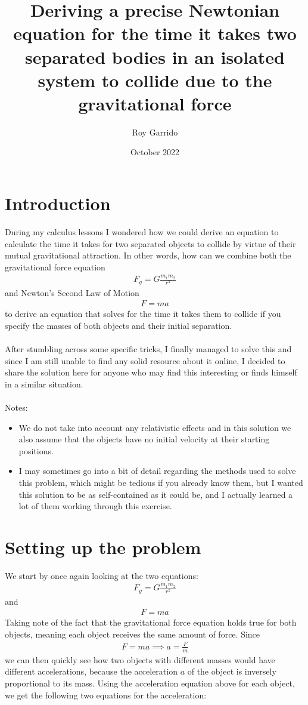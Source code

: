 \documentclass{article}
\title{Deriving a precise Newtonian equation for the time it takes two separated bodies in an isolated system to collide due to the gravitational force}
\author{Roy Garrido }
\date{October 2022}
\begin{document}
\maketitle

\section{Introduction}
During my calculus lessons I wondered how we could derive an equation to calculate the time it takes for two separated objects to collide by virtue of their mutual gravitational attraction. In other words, how can we combine both the gravitational force equation
\begin{align*}
    F_g = G \frac{m_1 m_2}{r^2}
\end{align*}
and Newton's Second Law of Motion
\begin{align*}
    F = ma
\end{align*}
to derive an equation that solves for the time it takes them to collide if you specify the masses of both objects and their initial separation.
\\
\\
After stumbling across some specific tricks, I finally managed to solve this and since I am still unable to find any solid resource about it online, I decided to share the solution here for anyone who may find this interesting or finds himself in a similar situation.
\\
\\
Notes:
\begin{itemize}
    \item We do not take into account any relativistic effects and in this solution we also assume that the objects have no initial velocity at their starting positions.
    \item I may sometimes go into a bit of detail regarding the methods used to solve this problem, which might be tedious if you already know them, but I wanted this solution to be as self-contained as it could be, and I actually learned a lot of them working through this exercise.
\end{itemize}

\newpage
\section{Setting up the problem}
We start by once again looking at the two equations:
\begin{align}
    F_g = G \frac{m_1 m_2}{r^2}
\end{align}
and
\begin{align}
    F = ma
\end{align}
Taking note of the fact that the gravitational force equation holds true for both objects, meaning each object receives the same amount of force. Since
\begin{align}
    F = ma \implies a = \frac{F}{m}
\end{align}
    we can then quickly see how two objects with different masses would have different accelerations, because the acceleration $a$ of the object is inversely proportional to its mass. Using the acceleration equation above for each object, we get the following two equations for the acceleration:
\end{document}
